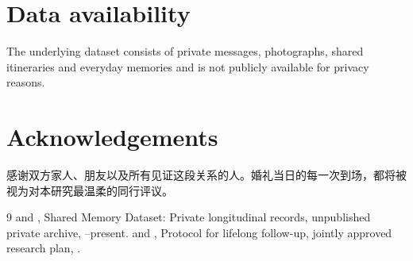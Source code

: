 \documentclass[9pt,twocolumn]{extarticle}
\begin{document}
\section*{Data availability}
The underlying dataset consists of private messages, photographs, shared itineraries and everyday memories and is not publicly available for privacy reasons.

\section*{Acknowledgements}
感谢双方家人、朋友以及所有见证这段关系的人。婚礼当日的每一次到场，都将被视为对本研究最温柔的同行评议。

\begin{thebibliography}{9}\fontsize{6.7}{8.2}\selectfont
{} \PartnerA{} and \PartnerB{}, Shared Memory Dataset: Private longitudinal records, unpublished private archive, \FirstMeetingDate{}--present.
 \PartnerA{} and \PartnerB{}, Protocol for lifelong follow-up, jointly approved research plan, \WeddingDate{}.
\end{thebibliography}
\end{document}
